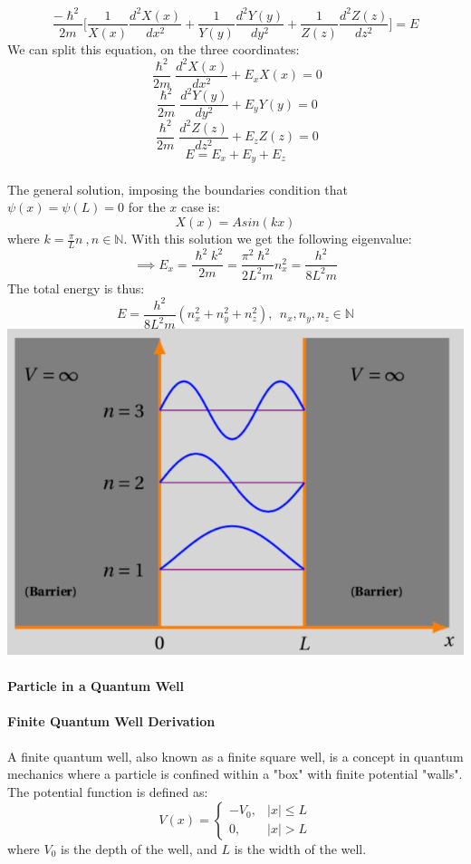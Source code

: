 \documentclass{article}
\begin{document}
$$\frac{-\hslash^2}{2m} \Biggl[ \frac{1}{X(x)} \frac{d^2X(x)}{dx^2} + \frac{1}{Y(y)} \frac{d^2Y(y)}{dy^2} + \frac{1}{Z(z)} \frac{d^2Z(z)}{dz^2} \Biggl]  = E$$
We can split this equation, on the three coordinates:
$$ \frac{\hslash^2}{2m} \frac{d^2X(x)}{dx^2} + E_x X(x) = 0$$
$$ \frac{\hslash^2}{2m} \frac{d^2Y(y)}{dy^2} + E_y Y(y) = 0$$
$$ \frac{\hslash^2}{2m} \frac{d^2Z(z)}{dz^2} + E_z Z(z) = 0$$
$$E = E_x+E_y+E_z$$ \\
The general solution, imposing the boundaries condition that $\psi(x) = \psi(L) = 0 $ for the $x$ case is: 
$$X(x) = Asin(kx)$$
where $k =\frac{\pi}{L}n\ , n \in \mathbb{N}.$
With this solution we get the following eigenvalue:
$$\implies E_x = \frac{\hslash^2k^2}{2m} = \frac{\pi^2\hslash^2}{2L^2m}n_x^2 = \frac{h^2}{8L^2m}$$
The total energy is thus:
$$E = \frac{h^2}{8L^2m} (n_x^2+n_y^2+n_z^2), \ \ n_x,n_y,n_z \in \mathbb{N}$$
\includegraphics[scale = 0.4]{PIAB.png} \\ \\ 
\textbf{Particle in a Quantum Well}\\ \\ 
\textbf{Finite Quantum Well Derivation} \\ \\
A finite quantum well, also known as a finite square well, is a concept in quantum mechanics where a particle is confined within a "box" with finite potential "walls". The potential function is defined as:
$$
V(x) = \begin{cases}
-V_0, & |x| \leq L \\
0, & |x| > L
\end{cases}
$$
where $V_0$ is the depth of the well, and $L$ is the width of the well.\\
\end{document}
